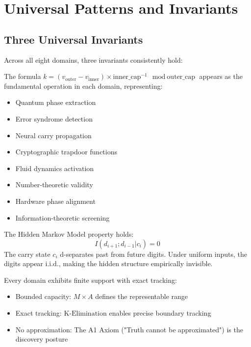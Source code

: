 \documentclass[11pt,letterpaper]{article}
\newcommand{\KElim}{\text{K-Elimination}}
\begin{document}
\newpage

\section{Universal Patterns and Invariants}
\label{sec:universal-properties}

\subsection{Three Universal Invariants}

Across all eight domains, three invariants consistently hold:

\begin{invariant}
\label{inv:phase-diff}
The formula \(k = (v_{\text{outer}} - v_{\text{inner}}) \times \text{inner\_cap}^{-1} \mod \text{outer\_cap}\) appears as the fundamental operation in each domain, representing:
\begin{itemize}
\item Quantum phase extraction
\item Error syndrome detection
\item Neural carry propagation
\item Cryptographic trapdoor functions
\item Fluid dynamics activation
\item Number-theoretic validity
\item Hardware phase alignment
\item Information-theoretic screening
\end{itemize}
\end{invariant}

\begin{invariant}
\label{inv:latent}
The Hidden Markov Model property holds:
\begin{equation*}
I(d_{i+1}; d_{i-1} | c_i) = 0
\end{equation*}
The carry state \(c_i\) d-separates past from future digits. Under uniform inputs, the digits appear i.i.d., making the hidden structure empirically invisible.
\end{invariant}

\begin{invariant}
\label{inv:bounded}
Every domain exhibits finite support with exact tracking:
\begin{itemize}
\item Bounded capacity: \(M \times A\) defines the representable range
\item Exact tracking: \(\KElim\) enables precise boundary tracking
\item No approximation: The A1 Axiom ("Truth cannot be approximated") is the discovery posture
\end{itemize}
\end{invariant}
\end{document}
